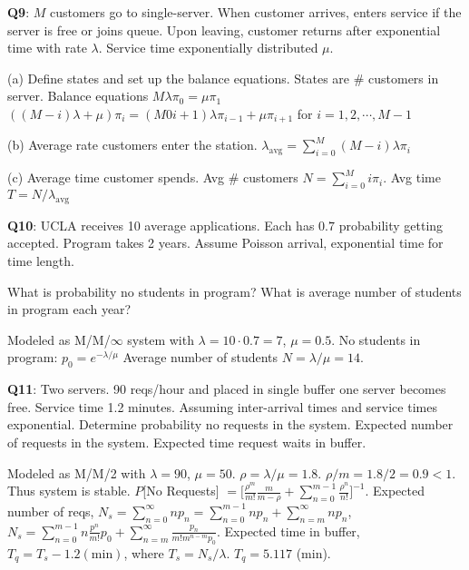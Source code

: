 \documentclass{scrartcl}
\begin{document}
\begin{multicols*}{3}
{\bf Q9}: $M$ customers go to single-server. When customer arrives, enters service if the server is free or joins queue. Upon leaving, customer returns after exponential time with rate $\lambda$. Service time exponentially distributed $\mu$.

(a) Define states and set up the balance equations. States are \# customers in server. Balance equations $M\lambda\pi_0=\mu\pi_1$\\$((M-i)\lambda+\mu)\pi_i=(M0i+1)\lambda\pi_{i-1}+\mu\pi_{i+1}$ for $i=1,2,\cdots,M-1$

(b) Average rate customers enter the station. $\lambda_{\text{avg}}=\sum_{i=0}^M(M-i)\lambda\pi_i$

(c) Average time customer spends. Avg \# customers $N=\sum_{i=0}^Mi\pi_i$. Avg time $T=N/\lambda_{\text{avg}}$



{\bf Q10}: UCLA receives 10 average applications. Each has $0.7$ probability getting accepted. Program takes 2 years. Assume Poisson arrival, exponential time for time length.

What is probability no students in program? What is average number of students in program each year?

Modeled as M/M/$\infty$ system with $\lambda=10\cdot 0.7=7$, $\mu=0.5$. No students in program: $p_0=e^{-\lambda/\mu}$ Average number of students $N=\lambda/\mu=14$.



{\bf Q11}: Two servers. 90 reqs/hour and placed in single buffer one server becomes free. Service time 1.2 minutes. Assuming inter-arrival times and service times exponential. Determine probability  no requests in the system. Expected number of requests in the system. Expected time request waits in buffer.

Modeled as M/M/2 with $\lambda=90$, $\mu=50$. $\rho=\lambda/\mu=1.8$. $\rho/m=1.8/2=0.9<1$. Thus system is stable. $P$[No Requests] $=\Big[\frac{\rho^m}{m!}\frac{m}{m-\rho}+\sum_{n=0}^{m-1}\frac{\rho^n}{n!}\Big]^{-1}$. Expected number of reqs, $N_s=\sum_{n=0}^\infty np_n=\sum_{n=0}^{m-1}np_n+\sum_{n=m}^\infty np_n$, $N_s=\sum_{n=0}^{m-1}n\frac{p^n}{m!}p_0+\sum_{n=m}^\infty \frac{p_n}{m!m^{n-m}p_0}$. Expected time in buffer, $T_q=T_s-1.2(\text{min})$, where $T_s=N_s/\lambda$. $T_q=5.117$ (min).




\end{multicols*}
\end{document}
